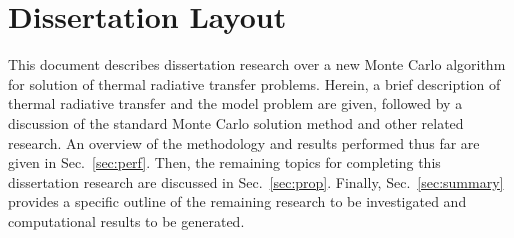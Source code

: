 \section{Dissertation Layout}

This document describes dissertation research over a new Monte Carlo algorithm for solution of
thermal radiative
transfer problems. Herein, a brief description of thermal radiative transfer and the
model problem are given, followed by a discussion of the standard Monte Carlo
solution method and other related research.  An overview of the methodology and
results performed thus far are given in Sec.~\ref{sec:perf}. Then, the remaining topics for completing this dissertation research
are discussed in Sec.~\ref{sec:prop}.  Finally, Sec.~\ref{sec:summary} provides a specific outline of the remaining research to be
investigated and computational results to be generated.


